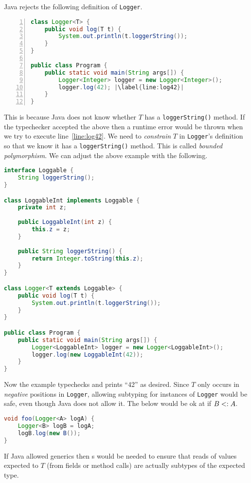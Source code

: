 \documentclass{article}
\begin{document}
\begin{example}
  Java rejects the following definition of \texttt{Logger}.
\begin{lstlisting}[escapechar=|, language=Java, numbers=left]
class Logger<T> {
    public void log(T t) {
        System.out.println(t.loggerString());
    }
}

public class Program {
    public static void main(String args[]) {
        Logger<Integer> logger = new Logger<Integer>();
        logger.log(42); |\label{line:log42}|
    }
}
\end{lstlisting}
  This is because Java does not know whether $T$ has a \texttt{loggerString()} method.
  If the typechecker accepted the above then a runtime error would be thrown when we try to execute line~\ref{line:log42}.
  We need to \textit{constrain} $T$ in \texttt{Logger}'s definition so that we know it has a \texttt{loggerString()} method.
  This is called \textit{bounded polymorphism}.
  We can adjust the above example with the following.
\begin{lstlisting}[escapechar=|, language=Java]
interface Loggable {
    String loggerString();
}

class LoggableInt implements Loggable {
    private int z;
    
    public LoggableInt(int z) {
        this.z = z;
    }
    
    public String loggerString() {
        return Integer.toString(this.z);
    }
}

class Logger<T extends Loggable> {
    public void log(T t) {
        System.out.println(t.loggerString());
    }
}

public class Program {
    public static void main(String args[]) {
        Logger<LoggableInt> logger = new Logger<LoggableInt>();
        logger.log(new LoggableInt(42));
    }
}
\end{lstlisting}
  Now the example typechecks and prints ``42'' as desired.
  Since $T$ only occurs in \textit{negative} positions in \texttt{Logger},
  allowing \contra{} subtyping for instances of \texttt{Logger} would be safe, even though Java does not allow it.
  The below would be ok at \runtime{} if $B <: A$.
\begin{lstlisting}[escapechar=|, language=Java]
void foo(Logger<A> logA) {
    Logger<B> logB = logA;
    logB.log(new B());
}
\end{lstlisting}
  If Java allowed \contra{} generics then \runtimecheck{}s would be needed to ensure that reads of values expected to $T$ (from fields or method calls) are actually subtypes of the expected type.
\end{example}
\end{document}
